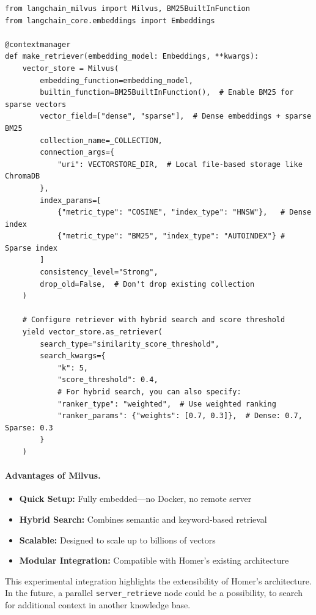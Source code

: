 \documentclass[11pt,a4paper]{report}
\begin{document}
\begin{minipage}{\linewidth}
\begin{lstlisting}[caption={Milvus hybrid retriever}]
from langchain_milvus import Milvus, BM25BuiltInFunction
from langchain_core.embeddings import Embeddings

@contextmanager
def make_retriever(embedding_model: Embeddings, **kwargs):
    vector_store = Milvus(
        embedding_function=embedding_model,
        builtin_function=BM25BuiltInFunction(),  # Enable BM25 for sparse vectors
        vector_field=["dense", "sparse"],  # Dense embeddings + sparse BM25
        collection_name=_COLLECTION,
        connection_args={
            "uri": VECTORSTORE_DIR,  # Local file-based storage like ChromaDB
        },
        index_params=[
            {"metric_type": "COSINE", "index_type": "HNSW"},   # Dense index
            {"metric_type": "BM25", "index_type": "AUTOINDEX"} # Sparse index
        ]
        consistency_level="Strong",
        drop_old=False,  # Don't drop existing collection
    )
    
    # Configure retriever with hybrid search and score threshold
    yield vector_store.as_retriever(
        search_type="similarity_score_threshold",
        search_kwargs={
            "k": 5,
            "score_threshold": 0.4,
            # For hybrid search, you can also specify:
            "ranker_type": "weighted",  # Use weighted ranking
            "ranker_params": {"weights": [0.7, 0.3]},  # Dense: 0.7, Sparse: 0.3
        }
    )
\end{lstlisting}
\end{minipage}

\paragraph{Advantages of Milvus.}
\begin{itemize}
    \item \textbf{Quick Setup:} Fully embedded—no Docker, no remote server
    \item \textbf{Hybrid Search:} Combines semantic and keyword-based retrieval
    \item \textbf{Scalable:} Designed to scale up to billions of vectors
    \item \textbf{Modular Integration:} Compatible with Homer's existing architecture
\end{itemize}

This experimental integration highlights the extensibility of Homer's architecture. In the future, a parallel \texttt{server\_retrieve} node could be a possibility, to search for additional context in another knowledge base.
\end{document}
